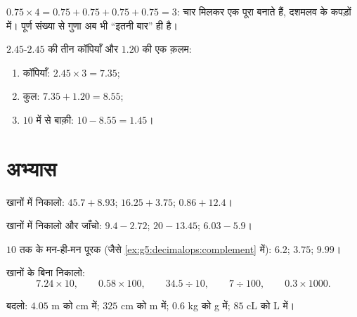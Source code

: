 \begin{example}[बार-बार जोड़ना अब भी चलता है]\label{ex:g5:decimalops:mult}
$0.75 \times 4 = 0.75 + 0.75 + 0.75 + 0.75 = 3$: चार  मिलकर
एक पूरा बनाते हैं, दशमलव के कपड़ों में। पूर्ण संख्या से गुणा अब
भी ``इतनी बार'' ही है।
\end{example}

\begin{example}[ख़रीदारी]\label{ex:g5:decimalops:shopping}
$2.45$-$2.45$ की तीन कॉपियाँ और $1.20$ की एक क़लम:
\begin{enumerate}
  \item कॉपियाँ: $2.45 \times 3 = 7.35$;
  \item कुल: $7.35 + 1.20 = 8.55$;
  \item $10$ में से बाक़ी: $10 - 8.55 = 1.45$।
\end{enumerate}
\end{example}

\section{अभ्यास}

\begin{exercise}[$\star$]\label{exo:g5:decimalops:1}
खानों में निकालो: $45.7 + 8.93$; \quad $16.25 + 3.75$; \quad
$0.86 + 12.4$।
\end{exercise}

\begin{exercise}[$\star$]\label{exo:g5:decimalops:2}
खानों में निकालो और जाँचो: $9.4 - 2.72$; \quad $20 - 13.45$;
\quad $6.03 - 5.9$।
\end{exercise}

\begin{exercise}[$\star$]\label{exo:g5:decimalops:3}
$10$ तक के मन-ही-मन पूरक (जैसे
\cref{ex:g5:decimalops:complement} में): $6.2$; \quad $3.75$; \quad
$9.99$।
\end{exercise}

\begin{exercise}[$\star$]\label{exo:g5:decimalops:4}
खानों के बिना निकालो:
\[
7.24 \times 10, \qquad
0.58 \times 100, \qquad
34.5 \div 10, \qquad
7 \div 100, \qquad
0.3 \times 1000 .
\]
\end{exercise}

\begin{exercise}[$\star$]\label{exo:g5:decimalops:5}
बदलो: $4.05$ m को cm में; \quad $325$ cm को m में; \quad $0.6$ kg को g में;
\quad $85$ cL को L में।
\end{exercise}

